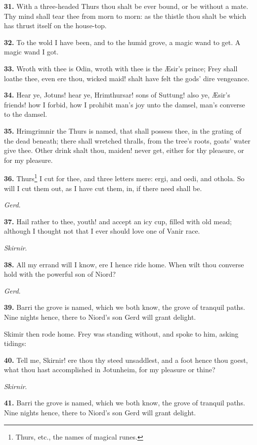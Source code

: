 \textbf{31.} With a three-headed Thurs thou shalt be ever bound, or be
without a mate. Thy mind shall tear thee from morn to morn: as the
thistle thou shalt be which has thrust itself on the house-top.

\textbf{32.} To the wold I have been, and to the humid grove, a magic wand to
get. A magic wand I got.

\textbf{33.} Wroth with thee is Odin, wroth with thee is the Æsir's prince;
Frey shall loathe thee, even ere thou, wicked maid! shalt have felt
the gods' dire vengeance.

\textbf{34.} Hear ye, Jotuns! hear ye, Hrimthursar! sons of Suttung! also ye,
Æsir's friends! how I forbid, how I prohibit man's joy unto the
damsel, man's converse to the damsel.

\textbf{35.} Hrimgrimnir the Thurs is named, that shall possess thee, in the
grating of the dead beneath; there shall wretched thralls, from the
tree's roots, goats' water give thee. Other drink shalt thou, maiden!
never get, either for thy pleasure, or for my pleasure.

\textbf{36.} Thurs\footnote{Thurs, etc., the names of magical runes.} I cut for thee, and three letters mere: ergi, and
oedi, and othola. So will I cut them out, as I have cut them, in, if
there need shall be.

\emph{Gerd}.

\textbf{37.} Hail rather to thee, youth! and accept an icy cup, filled with
old mead; although I thought not that I ever should love one of Vanir
race.

\emph{Skirnir}.

\textbf{38.} All my errand will I know, ere I hence ride home. When wilt thou
converse hold with the powerful son of Niord?

\emph{Gerd}.

\textbf{39.} Barri the grove is named, which we both know, the grove of
tranquil paths. Nine nights hence, there to Niord's son Gerd will
grant delight.

Skimir then rode home. Frey was standing without, and spoke to him,
asking tidings:

\textbf{40.} Tell me, Skirnir! ere thou thy steed unsaddlest, and a foot
hence thou goest, what thou hast accomplished in Jotunheim, for my
pleasure or thine?

\emph{Skirnir}.

\textbf{41.} Barri the grove is named, which we both know, the grove of
tranquil paths. Nine nights hence, there to Niord's son Gerd will
grant delight.

